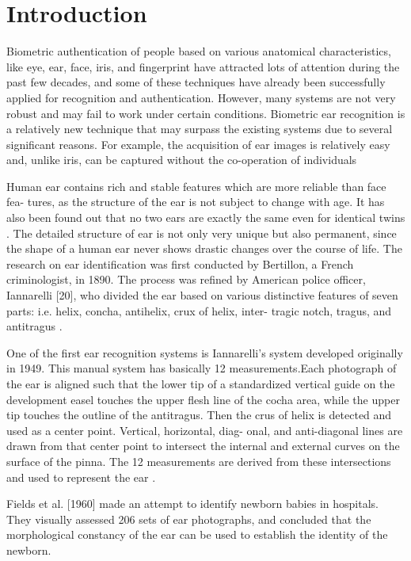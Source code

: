 \chapter{Introduction} \label{sec:intro} Biometric authentication of people based on various anatomical characteristics, like eye, ear, face, iris, and fingerprint have attracted lots of attention during the past few decades, and some of these techniques have already been successfully applied for recognition and authentication. However, many systems are not very robust and may fail to work under certain conditions. Biometric ear recognition is a relatively new technique that may surpass the existing systems due to several significant reasons. For example, the acquisition of ear images is relatively easy and, unlike iris, can be captured without the co-operation of individuals \cite{pflug2012ear}

Human ear contains rich and stable features which are more reliable than face fea- tures, as the structure of the ear is not subject to change with age. It has also been found out that no two ears are exactly the same even for identical twins \cite{abaza}. The detailed structure of ear is not only very unique but also permanent, since the shape of a human ear never shows drastic changes over the course of life. The research on ear identification was first conducted by Bertillon, a French criminologist, in 1890. The process was refined by American police officer, Iannarelli [20], who divided the ear based on various distinctive features of seven parts: i.e. helix, concha, antihelix, crux of helix, inter- tragic notch, tragus, and antitragus \cite{tariq}.

One of the first ear recognition systems is Iannarelli's system developed originally in 1949. This manual system has basically 12 measurements.Each photograph of the ear is aligned such that the lower tip of a standardized vertical guide on the development easel touches the upper flesh line of the cocha area, while the upper tip touches the outline of the antitragus. Then the crus of helix is detected and used as a center point. Vertical, horizontal, diag- onal, and anti-diagonal lines are drawn from that center point to intersect the internal and external curves on the surface of the pinna. The 12 measurements are derived from these intersections and used to represent the ear \cite{abaza}.

Fields et al. [1960] made an attempt to identify newborn babies in hospitals. They visually assessed 206 sets of ear photographs, and concluded that the morphological constancy of the ear can be used to establish the identity of the newborn.

